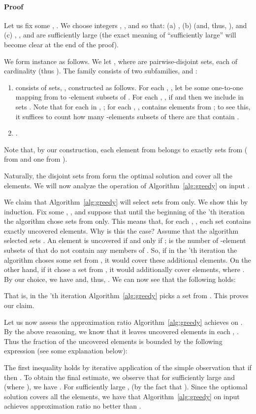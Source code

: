\documentclass[11pt]{article}
\newenvironment{proof}{\paragraph{Proof}}{\hfill\medskip}
\begin{document}
\begin{proof}
  Let us fix some , .  We choose integers ,
  , and  so that: (a) , (b) 
  (and, thus, ), and (c) , , and  are sufficiently
  large (the exact meaning of ``sufficiently large'' will become clear
  at the end of the proof). 

  We form instance  as follows.
We let , where  are
  pairwise-disjoint sets, each of cardinality 
  (thus ).  The family  consists of
  two subfamilies,  and :
  \begin{enumerate}
  \item  consists of  sets, ,
    constructed as follows. For each , , let 
    be some one-to-one mapping from  to -element subsets
    of . For each , , if  and
     then we include  in sets
    .  Note that for each
     in , ; for
    each , ,  contains  elements from ; to see this, it suffices to count how
    many -elements subsets of  there are that contain .
   

  \item .
  \end{enumerate}
Note that, by our construction, each element from  belongs to
  exactly  sets from  ( from  and one from
  ).

  Naturally, the  disjoint sets from  form the optimal
  solution and cover all the elements.  We will now analyze the
  operation of Algorithm~\ref{alg:greedy} on input .

  We claim that Algorithm~\ref{alg:greedy} will select sets from
   only. We show this by induction. Fix some , , and suppose that until the beginning of the 'th
  iteration the algorithm chose sets from  only.
This means that, for each , , each set 
  contains exactly  uncovered elements. Why is
  this the case? Assume that the algorithm selected sets . An element  is uncovered if and only
  if ;  is the number of -element subsets of  that
  do not contain any members of .  So, if in
  the 'th iteration the algorithm choses some set from ,
  it would cover these additional 
  elements. On the other hand, if it chose a set from , it
  would additionally cover  elements, where .  By our choice, we have 
  and, thus, . We can now see that the
  following holds:
  
  That is, in the 'th iteration Algorithm~\ref{alg:greedy} picks
  a set from . This proves our claim.

  Let us now assess the approximation ratio Algorithm~\ref{alg:greedy}
  achieves on . By the above reasoning, we know that it
  leaves  uncovered elements in each , .  Thus the fraction of the uncovered elements is
  bounded by the following expression (see some explanation below):
  
  The first inequality holds by iterative application of the simple
  observation that if  then .  To obtain the final estimate, we observe that for
  sufficiently large  and  (where ), we have
  . For
  sufficiently large ,  (by the fact that ).  Since the optiomal solution covers all the elements, we
  have that Algorithm~\ref{alg:greedy} on input  achieves
  approximation ratio no better than .~
\end{proof}
\end{document}
